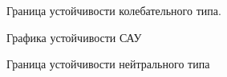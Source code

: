 \documentclass[a4paper, 12pt]{article}
\begin{document}
\begin{figure}[h]
	
	\caption{Граница устойчивости колебательного типа.}
\end{figure}

\begin{figure}
	\caption{Графика устойчивости САУ}
	

\end{figure}

\begin{figure}
	\caption{Граница устойчивости нейтрального типа}
	
	
\end{figure}
\end{document}
